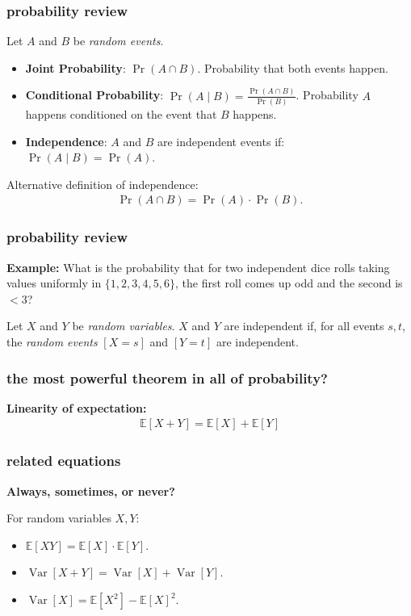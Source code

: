 \documentclass[]{beamer}
\newcommand{\E}{\mathbb{E}}
\DeclareMathOperator{\Var}{Var}
\begin{document}
	\begin{frame}
		\frametitle{probability review}
		Let $A$ and $B$ be \emph{random events}. 
		\begin{itemize}
			\item \textbf{Joint Probability}: \hspace{1em} $\Pr(A\cap B)$. Probability that both events happen.
			\item \textbf{Conditional Probability}: \hspace{1em}$\Pr(A\mid B) = \frac{\Pr(A\cap B)}{\Pr(B)}$. Probability $A$ happens conditioned on the event that $B$ happens.
			\item \textbf{Independence}: \hspace{1em} $A$ and $B$ are independent events if:
			$\Pr(A\mid B) = \Pr(A)$. 
		\end{itemize}
		Alternative definition of independence:
		\begin{align*}
			\Pr(A\cap B)  = \Pr(A)\cdot \Pr(B).
		\end{align*}
	\end{frame}
	
	\begin{frame}
		\frametitle{probability review}
		\textbf{Example:} What is the probability that for two independent dice rolls taking values uniformly in $\{1,2,3,4,5,6\}$, the first roll comes up odd and the second is $< 3$?
		
		\vspace{3em}
		Let $X$ and $Y$ be \emph{random variables}. $X$ and $Y$ are independent if, for all events $s, t$, the \emph{random events} $[X = s]$ and $[Y = t]$ are independent.
	\end{frame}
	
	\begin{frame}[t]
		\frametitle{the most powerful theorem in all of probability?}
		\textbf{Linearity of expectation:}
		\begin{align*}
			\E[X + Y] = \E[X] + \E[Y]
		\end{align*}
		\vspace{4em}
	\end{frame}
	
	\begin{frame}
		\frametitle{related equations}
		\begin{center}
			\textbf{Always, sometimes, or never?}
		\end{center}
		
		For random variables $X,Y$:
		\begin{itemize}
			\item $\E[XY] = \E[X]\cdot\E[Y]$. 
			\vspace{2em}
			\item $\Var[X + Y] = \Var[X] + \Var[Y]$. 
			\vspace{2em}
			\item $\Var[X] = \E[X^2] - \E[X]^2$.
		\end{itemize}
	\end{frame}
	
\end{document}
